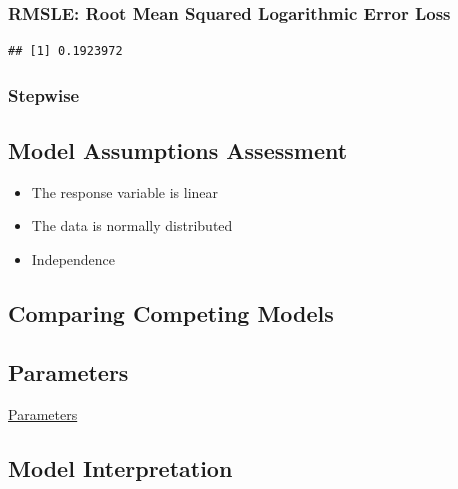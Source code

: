 \documentclass[american,]{article}
\providecommand{\tightlist}{%
  \setlength{\itemsep}{0pt}\setlength{\parskip}{0pt}}
\begin{document}
\hypertarget{rmsle-root-mean-squared-logarithmic-error-loss}{%
\subsubsection{RMSLE: Root Mean Squared Logarithmic Error Loss}\label{rmsle-root-mean-squared-logarithmic-error-loss}}

\begin{verbatim}
## [1] 0.1923972
\end{verbatim}

\hypertarget{stepwise}{%
\subsubsection{Stepwise}\label{stepwise}}

\newpage

\hypertarget{model-assumptions-assessment}{%
\subsection{Model Assumptions Assessment}\label{model-assumptions-assessment}}

\begin{itemize}
\tightlist
\item
  The response variable is linear
\item
  The data is normally distributed
\item
  Independence
\end{itemize}

\hypertarget{comparing-competing-models}{%
\subsection{Comparing Competing Models}\label{comparing-competing-models}}

\newpage

\hypertarget{parameters}{%
\subsection{Parameters}\label{parameters}}

\protect\hyperlink{parameters}{Parameters}

\hypertarget{model-interpretation}{%
\subsection{Model Interpretation}\label{model-interpretation}}
\end{document}
